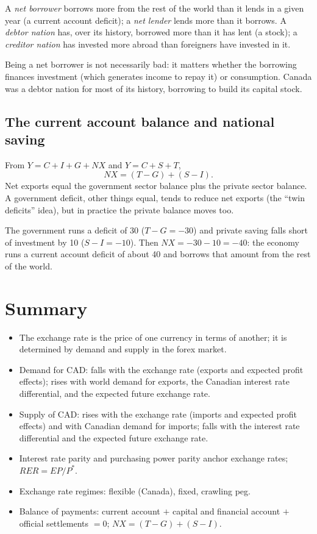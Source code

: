 \begin{definition}
A \emph{net borrower} borrows more from the rest of the world than it lends in a given
year (a current account deficit); a \emph{net lender} lends more than it borrows. A
\emph{debtor nation} has, over its history, borrowed more than it has lent (a stock); a
\emph{creditor nation} has invested more abroad than foreigners have invested in it.
\end{definition}

Being a net borrower is not necessarily bad: it matters whether the borrowing finances
investment (which generates income to repay it) or consumption. Canada was a debtor
nation for most of its history, borrowing to build its capital stock.

\subsection{The current account balance and national saving}

From $Y = C + I + G + NX$ and $Y = C + S + T$,
\[
  NX = (T - G) + (S - I).
\]
Net exports equal the government sector balance plus the private sector balance. A
government deficit, other things equal, tends to reduce net exports (the ``twin
deficits'' idea), but in practice the private balance moves too.

\begin{example}
The government runs a deficit of 30 ($T - G = -30$) and private saving falls short of
investment by 10 ($S - I = -10$). Then $NX = -30 - 10 = -40$: the economy runs a current
account deficit of about 40 and borrows that amount from the rest of the world.
\end{example}

\section{Summary}

\begin{itemize}
  \item The exchange rate is the price of one currency in terms of another; it is
        determined by demand and supply in the forex market.
  \item Demand for CAD: falls with the exchange rate (exports and expected profit
        effects); rises with world demand for exports, the Canadian interest rate
        differential, and the expected future exchange rate.
  \item Supply of CAD: rises with the exchange rate (imports and expected profit effects)
        and with Canadian demand for imports; falls with the interest rate differential and
        the expected future exchange rate.
  \item Interest rate parity and purchasing power parity anchor exchange rates;
        $RER = EP/P^{*}$.
  \item Exchange rate regimes: flexible (Canada), fixed, crawling peg.
  \item Balance of payments: current account $+$ capital and financial account $+$
        official settlements $= 0$; $NX = (T - G) + (S - I)$.
\end{itemize}
